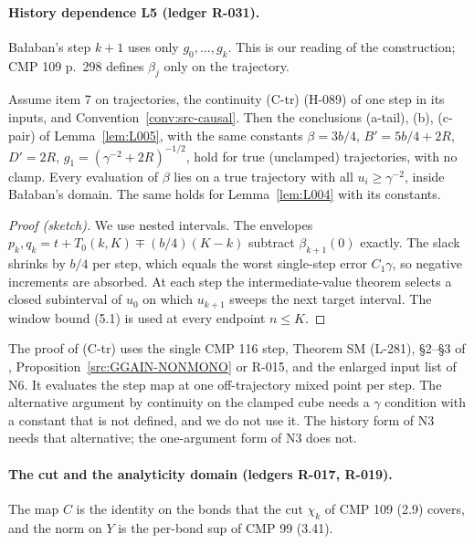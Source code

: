 \paragraph{History dependence L5 (ledger R-031).}
\begin{convention}\label{conv:src-causal}
Ba{\l}aban's step $k+1$ uses only $g_0,\dots,g_k$. This is our reading of the construction; CMP 109 p.~298 defines $\beta_j$ only on the trajectory.
\end{convention}

\begin{theorem}\label{thm:L030}
Assume item 7 on trajectories, the continuity (C-tr) (H-089) of one step in its inputs, and Convention~\ref{conv:src-causal}. Then the conclusions (a-tail), (b), (c-pair) of Lemma~\ref{lem:L005}, with the same constants $\beta=3b/4$, $B'=5b/4+2R$, $D'=2R$, $g_1=(\gamma^{-2}+2R)^{-1/2}$, hold for true (unclamped) trajectories, with no clamp. Every evaluation of $\beta$ lies on a true trajectory with all $u_i\ge\gamma^{-2}$, inside Ba{\l}aban's domain. The same holds for Lemma~\ref{lem:L004} with its constants.
\end{theorem}
\begin{proof}[Proof (sketch)]
We use nested intervals. The envelopes $p_k,q_k=t+T_0(k,K)\mp(b/4)(K-k)$ subtract $\beta_{k+1}(0)$ exactly. The slack shrinks by $b/4$ per step, which equals the worst single-step error $C_1\gamma$, so negative increments are absorbed. At each step the intermediate-value theorem selects a closed subinterval of $u_0$ on which $u_{k+1}$ sweeps the next target interval. The window bound (5.1) is used at every endpoint $n\le K$.
\end{proof}
The proof of (C-tr) uses the single CMP 116 step, Theorem SM (L-281), \S2--\S3 of , Proposition~\ref{src:GGAIN-NONMONO} or R-015, and the enlarged input list of N6. It evaluates the step map at one off-trajectory mixed point per step. The alternative argument by continuity on the clamped cube needs a $\gamma$ condition with a constant that is not defined, and we do not use it. The history form of N3 needs that alternative; the one-argument form of N3 does not.

\paragraph{The cut and the analyticity domain (ledgers R-017, R-019).}
\begin{convention}\label{conv:src-Cid}
The map $C$ is the identity on the bonds that the cut $\chi_k$ of CMP 109 (2.9) covers, and the norm on $Y$ is the per-bond sup of CMP 99 (3.41).
\end{convention}

